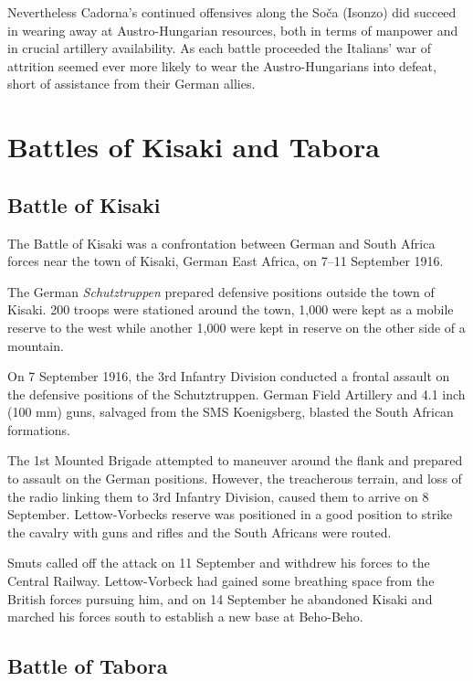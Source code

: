 \documentclass[a4paper,]{book}
\begin{document}
Nevertheless Cadorna's continued offensives along the Soča (Isonzo) did succeed in wearing away at Austro-Hungarian resources, both in terms of manpower and in crucial artillery availability. As each battle proceeded the Italians' war of attrition seemed ever more likely to wear the Austro-Hungarians into defeat, short of assistance from their German allies.



\section{Battles of Kisaki and Tabora}

\subsection{Battle of Kisaki}

The Battle of Kisaki was a confrontation between German and South Africa forces near the town of Kisaki, German East Africa, on 7–11 September 1916. 

The German \textit{Schutztruppen} prepared defensive positions outside the town of Kisaki. 200 troops were stationed around the town, 1,000 were kept as a mobile reserve to the west while another 1,000 were kept in reserve on the other side of a mountain.

On 7 September 1916, the 3rd Infantry Division conducted a frontal assault on the defensive positions of the Schutztruppen. German Field Artillery and 4.1 inch (100 mm) guns, salvaged from the SMS Koenigsberg, blasted the South African formations.

The 1st Mounted Brigade attempted to maneuver around the flank and prepared to assault on the German positions. However, the treacherous terrain, and loss of the radio linking them to 3rd Infantry Division, caused them to arrive on 8 September. Lettow-Vorbecks reserve was positioned in a good position to strike the cavalry with guns and rifles and the South Africans were routed.

Smuts called off the attack on 11 September and withdrew his forces to the Central Railway. Lettow-Vorbeck had gained some breathing space from the British forces pursuing him, and on 14 September he abandoned Kisaki and marched his forces south to establish a new base at Beho-Beho.

\subsection{Battle of Tabora}
\end{document}

